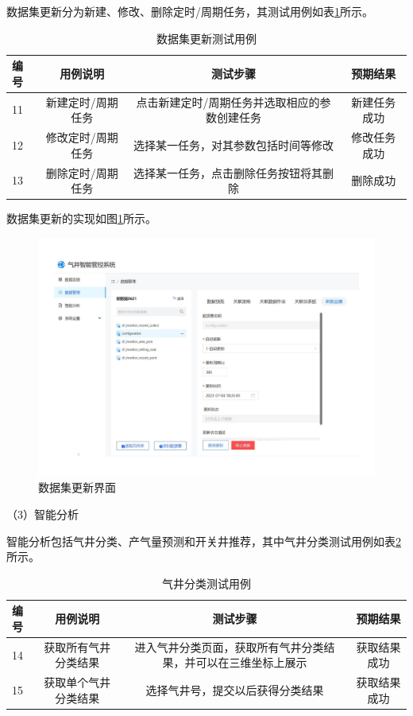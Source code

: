 数据集更新分为新建、修改、删除定时/周期任务，其测试用例如表\ref{tab:updatete}所示。

\begin{table}
    \renewcommand{\arraystretch}{1.5}
    \centering
    \caption{数据集更新测试用例}
    \label{tab:updatete}
    \begin{tabular}{|l|c|c|c|}
        \hline
        编号 & 用例说明 &测试步骤 & 预期结果 \\
        \hline
        11 & 新建定时/周期任务 & 点击新建定时/周期任务并选取相应的参数创建任务 & 新建任务成功 \\
        \hline
        12 & 修改定时/周期任务 & 选择某一任务，对其参数包括时间等修改 & 修改任务成功 \\
        \hline
        13 & 删除定时/周期任务 & 选择某一任务，点击删除任务按钮将其删除 & 删除成功 \\
        \hline
    \end{tabular}
\end{table}

数据集更新的实现如图\ref{fig:updatere}所示。

\begin{figure}
    \centering
    \includegraphics{figure/数据集操作.pdf}
    \caption{数据集更新界面}
    \label{fig:updatere}
\end{figure}

（3）智能分析

智能分析包括气井分类、产气量预测和开关井推荐，其中气井分类测试用例如表\ref{tab:clusterte}所示。

\begin{table}
    \renewcommand{\arraystretch}{1.5}
    \centering
    \caption{气井分类测试用例}
    \label{tab:clusterte}
    \begin{tabular}{|l|c|c|c|}
        \hline
        编号 & 用例说明 & 测试步骤 & 预期结果 \\
        \hline
        14 & 获取所有气井分类结果 & 进入气井分类页面，获取所有气井分类结果，并可以在三维坐标上展示 & 获取结果成功 \\
        \hline
        15 & 获取单个气井分类结果 & 选择气井号，提交以后获得分类结果 & 获取结果成功 \\
        \hline
    \end{tabular}
\end{table}

